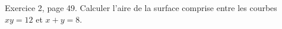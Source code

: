 \begin{exercice}\label{exoGeneral0023}

Exercice 2, page 49. Calculer l'aire de la surface comprise entre les courbes $xy=12$ et $x+y=8$.

\end{exercice}
